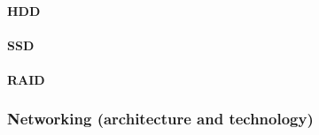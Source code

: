 \newpage

\paragraph{HDD}

\paragraph{SSD}

\paragraph{RAID}

\subsubsection{Networking (architecture and technology)}\label{subsubsection: Networking (architecture and technology)}
